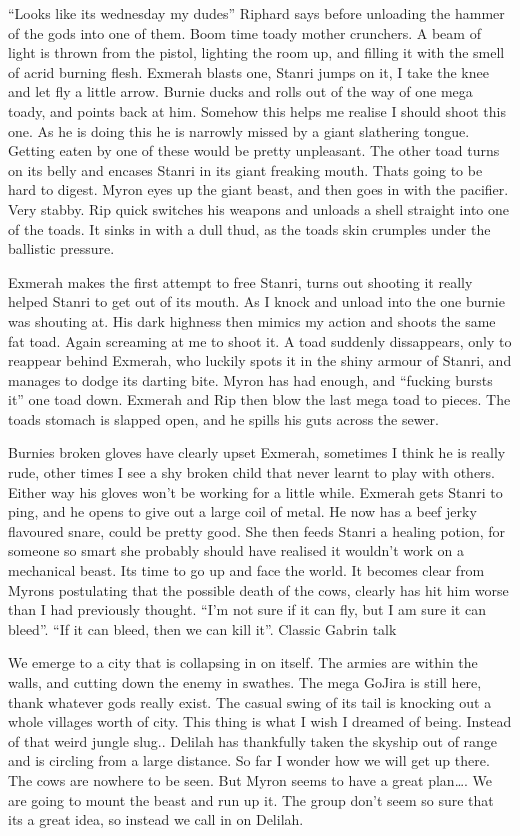 \begin{multicols}{2}
“Looks like its wednesday my dudes” Riphard says before unloading the hammer of the gods into one of them. Boom time toady mother crunchers. A beam of light is thrown from the pistol, lighting the room up, and filling it with the smell of acrid burning flesh. Exmerah blasts one, Stanri jumps on it, I take the knee and let fly a little arrow. Burnie ducks and rolls out of the way of one mega toady, and points back at him. Somehow this helps me realise I should shoot this one. As he is doing this he is narrowly missed by a giant slathering tongue. Getting eaten by one of these would be pretty unpleasant. The other toad turns on its belly and encases Stanri in its giant freaking mouth. Thats going to be hard to digest. Myron eyes up the giant beast, and then goes in with the pacifier. Very stabby. Rip quick switches his weapons and unloads a shell straight into one of the toads. It sinks in with a dull thud, as the toads skin crumples under the ballistic pressure.\medskip

Exmerah makes the first attempt to free Stanri, turns out shooting it really helped Stanri to get out of its mouth. As I knock and unload into the one burnie was shouting at. His dark highness then mimics my action and shoots the same fat toad. Again screaming at me to shoot it. A toad suddenly dissappears, only to reappear behind Exmerah, who luckily spots it in the shiny armour of Stanri, and manages to dodge its darting bite. Myron has had enough, and “fucking bursts it” one toad down. Exmerah and Rip then blow the last mega toad to pieces. The toads stomach is slapped open, and he spills his guts across the sewer.\medskip

Burnies broken gloves have clearly upset Exmerah, sometimes I think he is really rude, other times I see a shy broken child that never learnt to play with others. Either way his gloves won’t be working for a little while. Exmerah gets Stanri to ping, and he opens to give out a large coil of metal. He now has a beef jerky flavoured snare, could be pretty good. She then feeds Stanri a healing potion, for someone so smart she probably should have realised it wouldn’t work on a mechanical beast. Its time to go up and face the world. It becomes clear from Myrons postulating that the possible death of the cows, clearly has hit him worse than I had previously thought. “I’m not sure if it can fly, but I am sure it can bleed”. “If it can bleed, then we can kill it”. Classic Gabrin talk \medskip

We emerge to a city that is collapsing in on itself. The armies are within the walls, and cutting down the enemy in swathes. The mega GoJira is still here, thank whatever gods really exist. The casual swing of its tail is knocking out a whole villages worth of city. This thing is what I wish I dreamed of being. Instead of that weird jungle slug.. Delilah has thankfully taken the skyship out of range and is circling from a large distance. So far I wonder how we will get up there. The cows are nowhere to be seen. But Myron seems to have a great plan…. We are going to mount the beast and run up it. The group don’t seem so sure that its a great idea, so instead we call in on Delilah.\medskip


\end{multicols}
